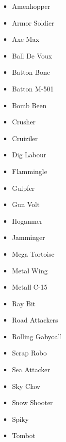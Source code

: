\begin{itemize}
	\item \hypertarget{enem:Amenhopper}{Amenhopper}
	\item \hypertarget{enem:Armor_Soldier}{Armor Soldier}
	\item \hypertarget{enem:Axe_Max}{Axe Max}
	\item \hypertarget{enem:Ball_De_Voux}{Ball De Voux}
	\item \hypertarget{enem:Batton_Bone}{Batton Bone}
	\item \hypertarget{enem:Batton_M-501}{Batton M-501} 
	\item \hypertarget{enem:Bomb_Been}{Bomb Been}
	\item \hypertarget{enem:Crusher}{Crusher}
	\item \hypertarget{enem:Cruiziler}{Cruiziler}
	\item \hypertarget{enem:Dig_Labour}{Dig Labour} 
	\item \hypertarget{enem:Flammingle}{Flammingle}
	\item \hypertarget{enem:Gulpfer}{Gulpfer}
	\item \hypertarget{enem:Gun_Volt}{Gun Volt}
	\item \hypertarget{enem:Hoganmer}{Hoganmer}
	\item \hypertarget{enem:Jamminger}{Jamminger}
	\item \hypertarget{enem:Mega_Tortoise}{Mega Tortoise}
	\item \hypertarget{enem:Metal_Wing}{Metal Wing}
	\item \hypertarget{enem:Metall_C-15}{Metall C-15} 
	\item \hypertarget{enem:Ray_Bit}{Ray Bit}
	\item \hypertarget{enem:Road_Attackers}{Road Attackers}
	\item \hypertarget{enem:Rolling_Gabyoall}{Rolling Gabyoall}
	\item \hypertarget{enem:Scrap_Robo}{Scrap Robo}
	\item \hypertarget{enem:Sea_Attacker}{Sea Attacker}
	\item \hypertarget{enem:Sky_Claw}{Sky Claw}
	\item \hypertarget{enem:Snow_Shooter}{Snow Shooter}
	\item \hypertarget{enem:Spiky}{Spiky}
	\item \hypertarget{enem:Tombot}{Tombot}
	




\end{itemize}
